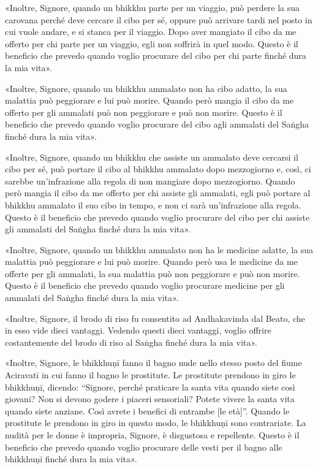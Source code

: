 «Inoltre, Signore, quando un bhikkhu parte per un viaggio, può perdere
la sua carovana perché deve cercare il cibo per sé, oppure può arrivare
tardi nel posto in cui vuole andare, e si stanca per il viaggio. Dopo
aver mangiato il cibo da me offerto per chi parte per un viaggio, egli
non soffrirà in quel modo. Questo è il beneficio che prevedo quando
voglio procurare del cibo per chi parte finché dura la mia vita».


«Inoltre, Signore, quando un bhikkhu ammalato non ha cibo adatto, la sua
malattia può peggiorare e lui può morire. Quando però mangia il cibo da
me offerto per gli ammalati può non peggiorare e può non morire. Questo
è il beneficio che prevedo quando voglio procurare del cibo agli
ammalati del Saṅgha finché dura la mia vita».


«Inoltre, Signore, quando un bhikkhu che assiste un ammalato deve
cercarsi il cibo per sé, può portare il cibo al bhikkhu ammalato dopo
mezzogiorno e, così, ci sarebbe un’infrazione alla regola di non
mangiare dopo mezzogiorno. Quando però mangia il cibo da me offerto per
chi assiste gli ammalati, egli può portare al bhikkhu ammalato il suo
cibo in tempo, e non ci sarà un’infrazione alla regola. Questo è il
beneficio che prevedo quando voglio procurare del cibo per chi assiste
gli ammalati del Saṅgha finché dura la mia vita».


«Inoltre, Signore, quando un bhikkhu ammalato non ha le medicine adatte,
la sua malattia può peggiorare e lui può morire. Quando però usa le
medicine da me offerte per gli ammalati, la sua malattia può non
peggiorare e può non morire. Questo è il beneficio che prevedo quando
voglio procurare medicine per gli ammalati del Saṅgha finché dura la mia
vita».


«Inoltre, Signore, il brodo di riso fu consentito ad Andhakavinda dal
Beato, che in esso vide dieci vantaggi. Vedendo questi dieci vantaggi,
voglio offrire costantemente del brodo di riso al Saṅgha finché dura la
mia vita».


«Inoltre, Signore, le bhikkhuṇī fanno il bagno nude nello stesso posto
del fiume Aciravatī in cui fanno il bagno le prostitute. Le prostitute
prendono in giro le bhikkhuṇī, dicendo: “Signore, perché praticare la
santa vita quando siete così giovani? Non si devono godere i piaceri
sensoriali? Potete vivere la santa vita quando siete anziane. Così
avrete i benefici di entrambe [le età]”. Quando le prostitute le
prendono in giro in questo modo, le bhikkhuṇī sono contrariate. La
nudità per le donne è impropria, Signore, è disgustosa e repellente.
Questo è il beneficio che prevedo quando voglio procurare delle vesti
per il bagno alle bhikkhuṇī finché dura la mia vita».


